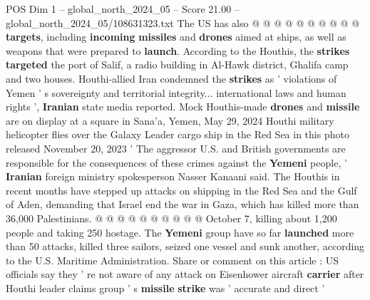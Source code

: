 \begin{textsample}{POS Dim 1 – global\_north\_2024\_05 – Score 21.00 – global\_north\_2024\_05/108631323.txt}
The US has also @ @ @ @ @ @ @ @ @ @ \textbf{targets}, including \textbf{incoming} \textbf{missiles} and \textbf{drones} aimed at ships, as well as weapons that were prepared to \textbf{launch}.
According to the Houthis, the \textbf{strikes} \textbf{targeted} the port of Salif, a radio building in Al-Hawk district, Ghalifa camp and two houses.
Houthi-allied Iran condemned the \textbf{strikes} as ' violations of Yemen ' s sovereignty and territorial integrity... international laws and human rights ', \textbf{Iranian} state media reported.
Mock Houthis-made \textbf{drones} and \textbf{missile} are on display at a square in Sana'a, Yemen, May 29, 2024 Houthi military helicopter flies over the Galaxy Leader cargo ship in the Red Sea in this photo released November 20, 2023 ' The aggressor U.S. and British governments are responsible for the consequences of these crimes against the \textbf{Yemeni} people, ' \textbf{Iranian} foreign ministry spokesperson Nasser Kanaani said.
The Houthis in recent months have stepped up attacks on shipping in the Red Sea and the Gulf of Aden, demanding that Israel end the war in Gaza, which has killed more than 36,000 Palestinians. @ @ @ @ @ @ @ @ @ @ October 7, killing about 1,200 people and taking 250 hostage.
The \textbf{Yemeni} group have so far \textbf{launched} more than 50 attacks, killed three sailors, seized one vessel and sunk another, according to the U.S.
Maritime Administration.
Share or comment on this article : US officials say they ' re not aware of any attack on Eisenhower aircraft \textbf{carrier} after Houthi leader claims group ' s \textbf{missile} \textbf{strike} was ' accurate and direct '

\end{textsample}
